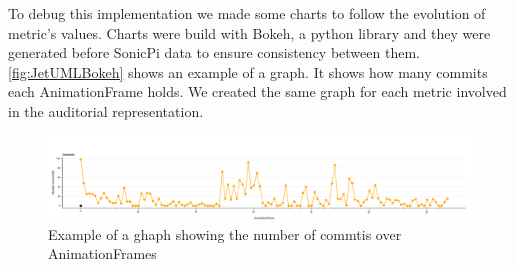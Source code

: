 To debug this implementation we made some charts to follow the evolution of metric's values. Charts were build with Bokeh, a python library and they were generated before SonicPi data to ensure consistency between them. \autoref{fig:JetUMLBokeh} shows an example of a graph. It shows how many commits each AnimationFrame holds. We created the same graph for each metric involved in the auditorial representation. 

\begin{figure}
    \center
    \includegraphics[width=\textwidth]{JetUMLBokeh.png}
    \caption{Example of a ghaph showing the number of commtis over AnimationFrames}
    \label{fig:JetUMLBokeh}
\end{figure}

